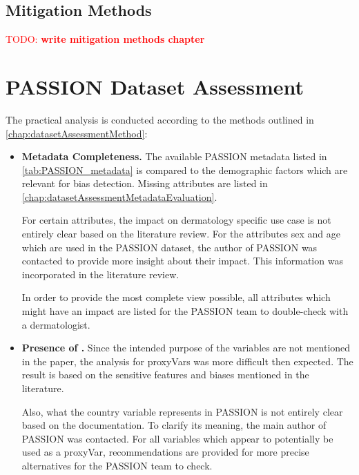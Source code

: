 \documentclass[12pt, a4paper, oneside]{book}   	%
\renewcommand{\todo}[1]{\textcolor{red}{TODO: #1}}
\begin{document}
		
		\subsection{Mitigation Methods}
		\todo{\textbf{write mitigation methods chapter}}
		
		
		
		
			
		\section{PASSION Dataset Assessment} \label{chap:datasetAssessmentExecution}
		The practical analysis is conducted according to the methods outlined in \autoref{chap:datasetAssessmentMethod}:
		
		\begin{itemize}
			\item \textbf{Metadata Completeness.}
			The available PASSION metadata listed in \autoref{tab:PASSION_metadata} is compared to the demographic factors which are relevant for bias detection. Missing attributes are listed in \autoref{chap:datasetAssessmentMetadataEvaluation}.
			
			For certain attributes, the impact on dermatology specific use case is not entirely clear based on the literature review. For the attributes sex and age which are used in the PASSION dataset, the author of PASSION was contacted to provide more insight about their impact. This information was incorporated in the literature review.
			
			In order to provide the most complete view possible, all attributes which might have an impact are listed for the PASSION team to double-check with a dermatologist.
			
			\item \textbf{Presence of .}
			Since the intended purpose of the variables are not mentioned in the paper, the analysis for \glspl{proxyVar} was more difficult then expected. The result is based on the sensitive features and biases mentioned in the literature.
			
			Also, what the country variable represents in PASSION is not entirely clear based on the documentation. To clarify its meaning, the main author of PASSION was contacted.
			For all variables which appear to potentially be used as a \gls{proxyVar}, recommendations are provided for more precise alternatives for the PASSION team to check.
			

\end{itemize}
\end{document}
